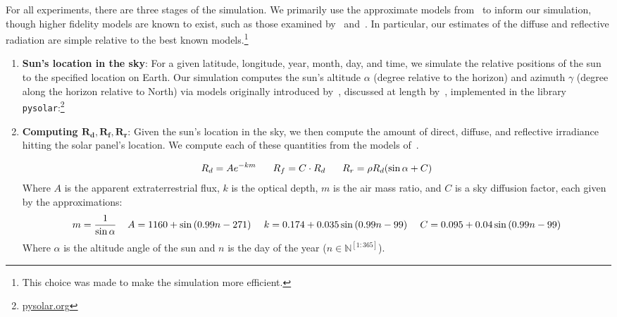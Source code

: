 \documentclass[11pt]{article}
\begin{document}
For all experiments, there are three stages of the simulation. We primarily use the approximate models from~\citet{masters2013renewable} to inform our simulation, though higher fidelity models are known to exist, such as those examined by~\citet{andersen1980comments,klein1977calculation} and~\citet{kamali2006estimating}. In particular, our estimates of the diffuse and reflective radiation are simple relative to the best known models.\footnote{This choice was made to make the simulation more efficient.}
\begin{enumerate}
\item {\bf Sun's location in the sky}: For a given latitude, longitude, year, month, day, and time, we simulate the relative positions of the sun to the specified location on Earth. Our simulation computes the sun's altitude $\alpha$ (degree relative to the horizon) and azimuth $\gamma$ (degree along the horizon relative to North) via models originally introduced by~\citet{jordan1958chafer}, discussed at length by~\citet{masters2013renewable}, implemented in the library \texttt{pysolar}:\footnote{\url{pysolar.org}}

\item {\bf Computing $\pmb{R_d, R_f, R_r}$}: Given the sun's location in the sky, we then compute the amount of direct, diffuse, and reflective irradiance hitting the solar panel's location. We compute each of these quantities from the models of~\citet{masters2013renewable}.

\begin{align*}
R_d = A e^{-km} \hspace{6mm} R_f = C \cdot R_d \hspace{6mm} R_r = \rho R_d (\sin \alpha + C)
\end{align*}
Where $A$ is the apparent extraterrestrial flux, $k$ is the optical depth, $m$ is the air mass ratio, and $C$ is a sky diffusion factor, each given by the approximations:
\begin{align*}
m = \frac{1}{\sin \alpha} \hspace{4mm} A = 1160 + \sin \left(0.99 n- 271\right) \hspace{4mm} k=0.174 + 0.035 \sin\left( 0.99 n - 99\right) \hspace{4mm} C=0.095 + 0.04 \sin\left(0.99 n-99\right)
\end{align*}
Where $\alpha$ is the altitude angle of the sun and $n$ is the day of the year ($n \in \mathbb{N}^{[1:365]}$).


\end{enumerate}
\end{document}
